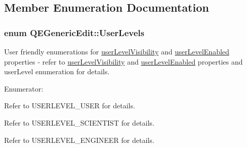 \subsection{Member Enumeration Documentation}
\hypertarget{classQEGenericEdit_a0d4ee4dc910113b53e1396e0736f28b7}{
\subsubsection[{UserLevels}]{\setlength{\rightskip}{0pt plus 5cm}enum {\bf QEGenericEdit::UserLevels}}}
\label{classQEGenericEdit_a0d4ee4dc910113b53e1396e0736f28b7}
User friendly enumerations for \hyperlink{classQEGenericEdit_a7f0733266f39549d361cdf65e34ebd30}{userLevelVisibility} and \hyperlink{classQEGenericEdit_ae18520d83fec62603db7e658efe00e3c}{userLevelEnabled} properties -\/ refer to \hyperlink{classQEGenericEdit_a7f0733266f39549d361cdf65e34ebd30}{userLevelVisibility} and \hyperlink{classQEGenericEdit_ae18520d83fec62603db7e658efe00e3c}{userLevelEnabled} properties and userLevel enumeration for details. \begin{Desc}
\item[Enumerator: ]\par
\begin{description}
\item[{\em 
\hypertarget{classQEGenericEdit_a0d4ee4dc910113b53e1396e0736f28b7a58230231609299c2f6c1cab4a7d5aedb}{
User}
\label{classQEGenericEdit_a0d4ee4dc910113b53e1396e0736f28b7a58230231609299c2f6c1cab4a7d5aedb}
}]Refer to USERLEVEL\_\-USER for details. \item[{\em 
\hypertarget{classQEGenericEdit_a0d4ee4dc910113b53e1396e0736f28b7ac942f3d3484a3a5bd465dcd2b3f52f19}{
Scientist}
\label{classQEGenericEdit_a0d4ee4dc910113b53e1396e0736f28b7ac942f3d3484a3a5bd465dcd2b3f52f19}
}]Refer to USERLEVEL\_\-SCIENTIST for details. \item[{\em 
\hypertarget{classQEGenericEdit_a0d4ee4dc910113b53e1396e0736f28b7a17b7bf8f749cca831e3c8f05a4a519fa}{
Engineer}
\label{classQEGenericEdit_a0d4ee4dc910113b53e1396e0736f28b7a17b7bf8f749cca831e3c8f05a4a519fa}
}]Refer to USERLEVEL\_\-ENGINEER for details. \end{description}
\end{Desc}



